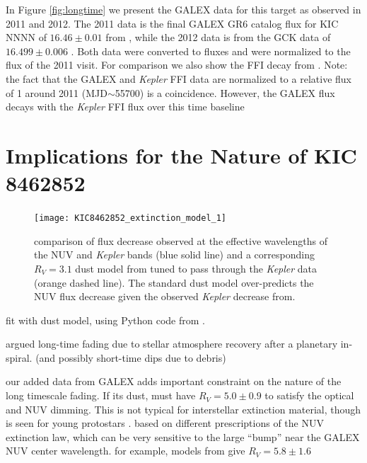 \documentclass[twocolumn]{aastex6}
\newcommand{\Kepler}{\textsl{Kepler}\xspace}
\begin{document}
In Figure \ref{fig:longtime} we present the GALEX data for this target as observed in 2011 and 2012. The 2011 data is the final GALEX GR6 catalog flux for KIC NNNN of $16.46 \pm 0.01$ from \citet{bianchi2014}, while the 2012 data is from the GCK data of $16.499\pm0.006$ \citet{olmedo2015}. Both data were converted to fluxes and were normalized to the flux of the 2011 visit. For comparison we also show the FFI decay from \citet{montet2016}. Note: the fact that the GALEX and \Kepler FFI data are normalized to a relative flux of 1 around 2011 (MJD$\sim$55700) is a coincidence. However, the GALEX flux decays with the \Kepler FFI flux over this time baseline






\section{Implications for the Nature of KIC 8462852}
\label{sec:dust}

\begin{figure}[!t]
\centering
\texttt{[image: KIC8462852\_extinction\_model\_1]}
\caption{comparison of flux decrease observed at the effective wavelengths of the NUV and \Kepler bands (blue solid line) and a corresponding $R_V=3.1$ dust model from \citet{cardelli1989} tuned to pass through the \Kepler data (orange dashed line). The standard dust model over-predicts the NUV flux decrease given the observed \Kepler decrease from\citet{montet2016}.}
\label{fig:dust}
\end{figure}


fit with \citet{cardelli1989} dust model, using Python code from \citet{barbary2016}.



\citet{metzger2017} argued long-time fading due to stellar atmosphere recovery after a planetary in-spiral. (and possibly short-time dips due to debris) 

our added data from GALEX adds important constraint on the nature of the long timescale fading. If its dust, must have $R_V=5.0\pm0.9$ to satisfy the optical and NUV dimming. This is not typical for interstellar extinction material, though is seen for young protostars \citep[e.g.][]{hecht1982}. based on different prescriptions of the NUV extinction law, which can be very sensitive to the large ``bump'' near the GALEX NUV center wavelength.  
for example, models from \citet{fitzpatrick2009}give $R_V=5.8\pm1.6$
\end{document}
